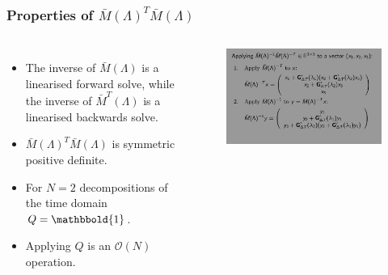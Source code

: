 \documentclass[9pt]{beamer}
\begin{document}
\begin{frame}
\frametitle{Properties of $\bar M(\Lambda)^T\bar M(\Lambda)$}
\begin{columns}
\begin{itemize}
\item{The inverse of $\bar M(\Lambda)$ is a linearised forward solve, while the inverse of $\bar M^T(\Lambda)$ is a linearised backwards solve.}
\item{$\bar M(\Lambda)^T\bar M(\Lambda)$ is symmetric positive definite.}
\item{For $N=2$ decompositions of the time domain $Q=\mathbbold{1}$.}
\item{Applying $Q$ is an $\mathcal{O}(N)$ operation.}
\end{itemize}
\centering
\begin{figure}[!h]
\centering
\includegraphics[scale=0.24]{apply.png}
\end{figure}
\end{columns}
\end{frame}

\end{document}
